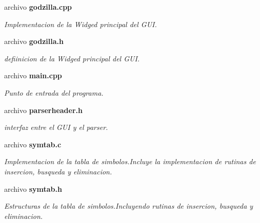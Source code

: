 \begin{CompactItemize}
\item 
archivo {\bf godzilla.cpp}
\begin{CompactList}\small\item\em Implementacion de la Widged principal del GUI. \item\end{CompactList}

\item 
archivo {\bf godzilla.h}
\begin{CompactList}\small\item\em defiinicion de la Widged principal del GUI. \item\end{CompactList}

\item 
archivo {\bf main.cpp}
\begin{CompactList}\small\item\em Punto de entrada del programa. \item\end{CompactList}

\item 
archivo {\bf parserheader.h}
\begin{CompactList}\small\item\em interfaz entre el GUI y el parser. \item\end{CompactList}

\item 
archivo {\bf symtab.c}
\begin{CompactList}\small\item\em Implementacion de la tabla de simbolos.Incluye la implementacion de rutinas de insercion, busqueda y eliminacion. \item\end{CompactList}

\item 
archivo {\bf symtab.h}
\begin{CompactList}\small\item\em Estructuras de la tabla de simbolos.Incluyendo rutinas de insercion, busqueda y eliminacion. \item\end{CompactList}

\end{CompactItemize}
